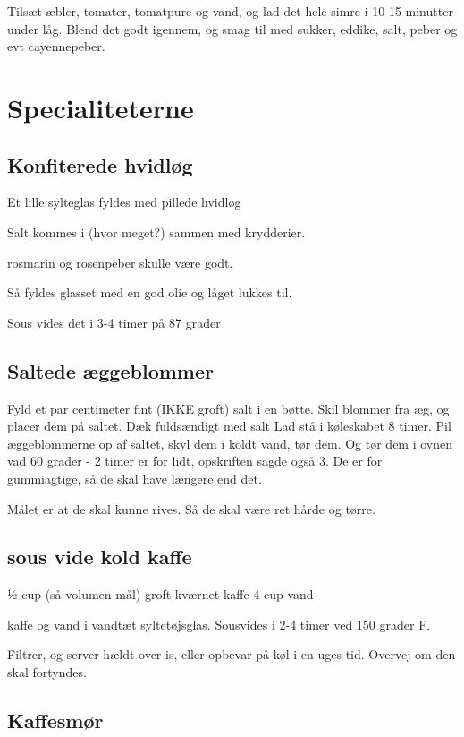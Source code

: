 \documentclass[
]{book}
\begin{document}
Tilsæt æbler, tomater, tomatpure og vand, og lad det hele simre i 10-15 minutter under låg. Blend det godt igennem, og smag til med sukker, eddike, salt, peber og evt cayennepeber.

\chapter{Specialiteterne}\label{specialiteterne}

\section{Konfiterede hvidløg}\label{konfiterede-hvidluxf8g}

Et lille sylteglas fyldes med pillede hvidløg

Salt kommes i (hvor meget?) sammen med krydderier.

rosmarin og rosenpeber skulle være godt.

Så fyldes glasset med en god olie og låget lukkes til.

Sous vides det i 3-4 timer på 87 grader

\section{Saltede æggeblommer}\label{saltede-uxe6ggeblommer}

Fyld et par centimeter fint (IKKE groft) salt i en bøtte.
Skil blommer fra æg, og placer dem på saltet. Dæk fuldsændigt med salt
Lad stå i køleskabet 8 timer.
Pil æggeblommerne op af saltet, skyl dem i koldt vand, tør dem. Og
tør dem i ovnen vad 60 grader - 2 timer er for lidt, opskriften sagde også 3.
De er for gummiagtige, så de skal have længere end det.

Målet er at de skal kunne rives. Så de skal være ret hårde og tørre.

\section{sous vide kold kaffe}\label{sous-vide-kold-kaffe}

½ cup (så volumen mål) groft kværnet kaffe
4 cup vand

kaffe og vand i vandtæt syltetøjsglas. Sousvides i 2-4 timer ved 150 grader F.

Filtrer, og server hældt over is, eller opbevar på køl i en uges tid.
Overvej om den skal fortyndes.

\section{Kaffesmør}\label{kaffesmuxf8r}
\end{document}
